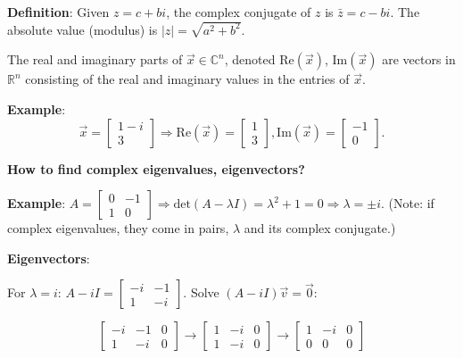 \documentclass{article}
\begin{document}
\textbf{Definition}: 
Given \( z = c + bi \), the complex conjugate of \( z \) is \( \bar{z} = c - bi \). The absolute value (modulus) is \( |z| = \sqrt{a^2 + b^2} \).

The real and imaginary parts of \( \vec{x} \in \mathbb{C}^n \), denoted \( \text{Re}(\vec{x}) \), \( \text{Im}(\vec{x}) \) are vectors in \( \mathbb{R}^n \) consisting of the real and imaginary values in the entries of \( \vec{x} \).

\textbf{Example}: 
\[
\vec{x} = \begin{bmatrix} 1 - i \\ 3 \end{bmatrix} \Rightarrow \text{Re}(\vec{x}) = \begin{bmatrix} 1 \\ 3 \end{bmatrix}, \text{Im}(\vec{x}) = \begin{bmatrix} -1 \\ 0 \end{bmatrix}.
\]


\textbf{How to find complex eigenvalues, eigenvectors?}

\textbf{Example}: $A = \left[ \begin{array}{cc} 0 & -1 \\ 1 & 0 \end{array} \right] \Rightarrow \text{det}(A - \lambda I) = \lambda^2 + 1 = 0 \Rightarrow \lambda = \pm i$. (Note: if complex eigenvalues, they come in pairs, $\lambda$ and its complex conjugate.)

\textbf{Eigenvectors}:

For $\lambda = i$: $A - iI = \left[ \begin{array}{cc} -i & -1 \\ 1 & -i \end{array} \right]$. Solve $(A - iI)\vec{v} = \vec{0}$:

\[ \left[ \begin{array}{cc|c} -i & -1 & 0 \\ 1 & -i & 0 \end{array} \right] \rightarrow \left[ \begin{array}{cc|c} 1 & -i & 0 \\ 1 & -i & 0 \end{array} \right] \rightarrow \left[ \begin{array}{cc|c} 1 & -i & 0 \\ 0 & 0 & 0 \end{array} \right] \]
\end{document}
